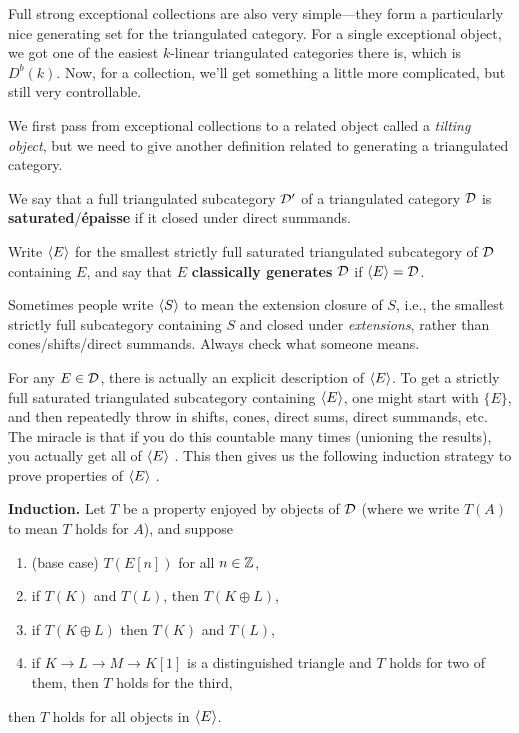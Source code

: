 \documentclass[12pt]{article}
\begin{document}
Full strong exceptional collections are also very simple---they form a particularly nice generating set for the triangulated category. For a single exceptional object, we got one of the easiest $k$-linear triangulated categories there is, which is $D^b(k)$. Now, for a collection, we'll get something a little more complicated, but still very controllable.

We first pass from exceptional collections to a related object called a \textit{tilting object}, but we need to give another definition related to generating a triangulated category.
\begin{defn}
    We say that a full triangulated subcategory $\mathcal{D}'$ of a triangulated category $\mathcal{D}$ is \textbf{saturated}/\textbf{\'epaisse} if it closed under direct summands.

    Write $\left\langle E\right\rangle$ for the smallest strictly full saturated triangulated subcategory of $\mathcal{D}$ containing $E$, and say that $E$ \textbf{classically generates} $\mathcal{D}$ if $\left\langle E\right\rangle=\mathcal{D}$.
\end{defn}

\begin{warning}
    Sometimes people write $\left\langle S\right\rangle$ to mean the extension closure of $S$, i.e., the smallest strictly full subcategory containing $S$ and closed under \textit{extensions}, rather than cones/shifts/direct summands. Always check what someone means.
\end{warning}

\begin{rmk}\label{induction-triangulated-cat}
    For any $E\in \mathcal{D}$, there is actually an explicit description of $\left\langle E\right\rangle$. To get a strictly full saturated triangulated subcategory containing $\left\langle E\right\rangle$, one might start with $\{E\}$, and then repeatedly throw in shifts, cones, direct sums, direct summands, etc. The miracle is that if you do this countable many times (unioning the results), you actually get all of $\left\langle E\right\rangle$ \cite[Lemma 13.36.2]{stacks-project}. This then gives us the following induction strategy to prove properties of $\left\langle E\right\rangle$ \cite[Remark 13.36.7]{stacks-project}.

    \textbf{Induction.} Let $T$ be a property enjoyed by objects of $\mathcal{D}$ (where we write $T(A)$ to mean $T$ holds for $A$), and suppose
    \begin{enumerate}[(1)]
        \item (base case) $T(E[n])$ for all $n\in \mathbb{Z}$,
        \item if $T(K)$ and $T(L)$, then $T(K\oplus L)$,
        \item if $T(K\oplus L)$ then $T(K)$ and $T(L)$,
        \item if $K\to L \to M \to K[1]$ is a distinguished triangle and $T$ holds for two of them, then $T$ holds for the third,
    \end{enumerate}
    then $T$ holds for all objects in $\left\langle E\right\rangle$.
\end{rmk}
\end{document}
